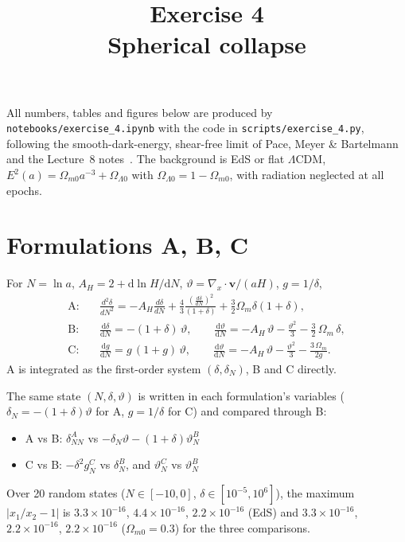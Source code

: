 \documentclass[11pt,a4paper]{article}
\title{Exercise 4\\[2pt]\large Spherical collapse}
\date{}
\begin{document}
\maketitle

All numbers, tables and figures below are produced by \texttt{notebooks/exercise\_4.ipynb} with the code in \texttt{scripts/exercise\_4.py}, following the smooth-dark-energy, shear-free limit of Pace, Meyer \& Bartelmann~\cite{Pace2017} and the Lecture~8 notes~\cite{Notes}. The background is EdS or flat $\Lambda$CDM, $E^2(a)=\Omega_{m0}a^{-3}+\Omega_{\Lambda0}$ with $\Omega_{\Lambda0}=1-\Omega_{m0}$, with radiation neglected at all epochs.

\section{Formulations A, B, C}

For $N=\ln a$, $A_H = 2+\mathrm{d}\ln H/\mathrm{d}N$, $\vartheta=\nabla_x\cdot\boldsymbol v/(aH)$, $g=1/\delta$,
\begin{align}
\text{A:}\quad & \frac{d^2\delta}{dN^2} = - A_H \frac{d\delta}{dN} + \frac{4}{3} \frac{(\frac{d\delta}{dN})^2}{(1 + \delta)} + \frac{3}{2} \Omega_m\delta (1 + \delta), \label{eq:A}\\
\text{B:}\quad & \frac{\mathrm{d}\delta}{\mathrm{d}N} = -(1+\delta)\,\vartheta, \qquad
\frac{\mathrm{d}\vartheta}{\mathrm{d}N} = -A_H\,\vartheta - \frac{\vartheta^2}{3} - \frac{3}{2}\,\Omega_m\,\delta, \label{eq:B}\\
\text{C:}\quad & \frac{\mathrm{d}g}{\mathrm{d}N} = g\,(1+g)\,\vartheta, \qquad
\frac{\mathrm{d}\vartheta}{\mathrm{d}N} = -A_H\,\vartheta - \frac{\vartheta^2}{3} - \frac{3\,\Omega_m}{2g}. \label{eq:C}
\end{align}
A is integrated as the first-order system $(\delta,\delta_N)$, B and C directly. 

The same state $(N,\delta,\vartheta)$ is written in each formulation's variables ($\delta_N=-(1+\delta)\vartheta$ for A, $g=1/\delta$ for C) and compared through B:
\begin{itemize}
\item A vs B: $\delta_{NN}^A$ vs $-\delta_N\vartheta-(1+\delta)\vartheta_N^B$
\item C vs B: $-\delta^2 g_N^C$ vs $\delta_N^B$, and $\vartheta_N^C$ vs $\vartheta_N^B$
\end{itemize}
Over 20 random states ($N\in[-10,0]$, $\delta\in[10^{-5},10^6]$), the maximum $|x_1/x_2-1|$ is $3.3\times10^{-16}$, $4.4\times10^{-16}$, $2.2\times10^{-16}$ (EdS) and $3.3\times10^{-16}$, $2.2\times10^{-16}$, $2.2\times10^{-16}$ ($\Omega_{m0}=0.3$) for the three comparisons.
\end{document}
